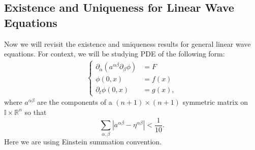 \documentclass{article}
\numberwithin{equation}{section}
\begin{document}
	\subsection{Existence and Uniqueness for Linear Wave Equations}
	Now we will revisit the existence and uniqueness results for general linear wave equations. For context, we will be studying PDE of the following form: 
	\begin{align}
		\left\{
		\begin{aligned}
			\partial_{\alpha}(a^{\alpha\beta}\partial_{\beta}\phi) &= F \\
			\phi(0,x) &= f(x) \\
			\partial_{t}\phi(0,x) &= g(x),
		\end{aligned}
		\right.
		\label{eq:gen_lin_we}
	\end{align}
	where $a^{\alpha\beta}$ are the components of a $(n + 1)\times (n + 1)$ symmetric matrix on $\mathbb{I} \times \mathbb{R}^{n}$ so that 
	\begin{equation*}
		\sum_{\alpha,\beta}|a^{\alpha\beta} -\eta^{\alpha\beta}| < \frac{1}{10}. 
	\end{equation*}
	Here we are using Einstein summation convention. 
	
\end{document}
